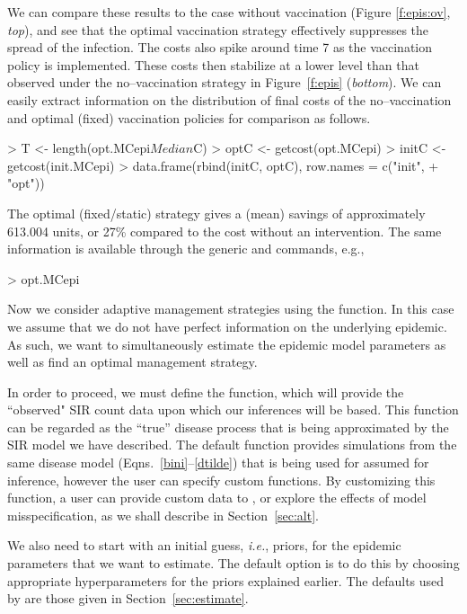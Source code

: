 \documentclass[shortnames,nojss]{jss}
\begin{document}
We can compare these results to the case without vaccination (Figure
\ref{f:epis:ov}, {\em top}), and see that the optimal vaccination
strategy effectively suppresses the spread of the infection. The costs
also spike around time 7 as the vaccination policy is
implemented. These costs then stabilize at a lower level than that
observed under the no--vaccination strategy in Figure~\ref{f:epis}
({\em bottom}). We can easily extract information on the distribution
of final costs of the no--vaccination and optimal (fixed) vaccination
policies for comparison as follows.
\begin{Schunk}
\begin{Sinput}
> T <- length(opt.MCepi$Median$C)
> optC <- getcost(opt.MCepi)
> initC <- getcost(init.MCepi)
> data.frame(rbind(initC, optC), row.names = c("init", 
+     "opt"))
\end{Sinput}
\end{Schunk}
The optimal (fixed/static) strategy gives a (mean) savings of
approximately 613.004 units, or
27\% compared to the cost 
without an intervention.  The same 
information is available through the generic  and
 commands, e.g.,
\begin{Schunk}
\begin{Sinput}
> opt.MCepi
\end{Sinput}
\end{Schunk}

Now we consider adaptive management strategies using the 
function. In this case we assume that we do not have perfect
information on the underlying epidemic.  As such, we want to
simultaneously estimate the epidemic model parameters as well as find
an optimal management strategy.

In order to proceed, we must define the  function, which
will provide the ``observed" SIR count data upon which our inferences
will be based.  This function can be regarded as the ``true'' disease
process that is being approximated by the SIR model we have described.
The default  function provides simulations from the same
disease model (Eqns.~\ref{bini}--\ref{dtilde}) that is being used for
assumed for inference, however the user can specify custom
 functions.  By customizing this function, a user can
provide custom data to , or explore the effects of model
misspecification, as we shall describe in Section~\ref{sec:alt}.

We also need to start with an initial guess, {\em i.e.}, priors, for the
epidemic parameters that we want to estimate. The default option is to
do this by choosing appropriate hyperparameters for the priors
explained earlier.  The defaults used by  are those
given in Section~\ref{sec:estimate}. 
\end{document}
